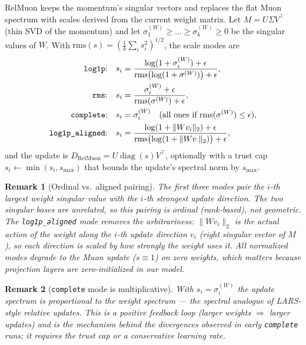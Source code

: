 \documentclass{article}
\newtheorem{remark}{Remark}
\DeclareMathOperator{\diag}{diag}
\begin{document}
RelMuon keeps the momentum's singular vectors and replaces the flat Muon
spectrum with scales derived from the current weight matrix. Let
$M = U \Sigma V^\top$ (thin SVD of the momentum) and let
$\sigma^{(W)}_1 \ge \dots \ge \sigma^{(W)}_k \ge 0$ be the singular values of
$W$. With $\mathrm{rms}(s) = (\frac1k \sum_i s_i^2)^{1/2}$, the scale modes
are
\begin{align}
\text{\texttt{log1p}:}\quad & s_i = \frac{\log(1+\sigma^{(W)}_i) + \epsilon}
{\mathrm{rms}\bigl(\log(1+\sigma^{(W)})\bigr) + \epsilon},\\
\text{\texttt{rms}:}\quad & s_i = \frac{\sigma^{(W)}_i + \epsilon}
{\mathrm{rms}(\sigma^{(W)}) + \epsilon},\\
\text{\texttt{complete}:}\quad & s_i = \sigma^{(W)}_i
\quad (\text{all ones if } \mathrm{rms}(\sigma^{(W)}) \le \epsilon),\\
\text{\texttt{log1p\_aligned}:}\quad & s_i =
\frac{\log(1+\|W v_i\|_2) + \epsilon}
{\mathrm{rms}\bigl(\log(1+\|W v_\cdot\|_2)\bigr) + \epsilon},
\end{align}
and the update is $D_{\mathrm{RelMuon}} = U \diag(s) V^\top$, optionally with
a trust cap $s_i \leftarrow \min(s_i, s_{\max})$ that bounds the update's
spectral norm by $s_{\max}$.

\begin{remark}[Ordinal vs.\ aligned pairing]
The first three modes pair the $i$-th largest weight singular value with the
$i$-th strongest \emph{update} direction. The two singular bases are
unrelated, so this pairing is ordinal (rank-based), not geometric. The
\texttt{log1p\_aligned} mode removes the arbitrariness: $\|W v_i\|_2$ is the
actual action of the weight along the $i$-th update direction $v_i$
(right singular vector of $M$), so each direction is scaled by how strongly
the weight uses it. All normalized modes degrade to the Muon update
($s \equiv 1$) on zero weights, which matters because projection layers are
zero-initialized in our model.
\end{remark}

\begin{remark}[\texttt{complete} mode is multiplicative]
With $s_i = \sigma^{(W)}_i$ the update spectrum is proportional to the weight
spectrum — the spectral analogue of LARS-style relative updates. This is a
positive feedback loop (larger weights $\Rightarrow$ larger updates) and is
the mechanism behind the divergences observed in early \texttt{complete}
runs; it requires the trust cap or a conservative learning rate.
\end{remark}
\end{document}

